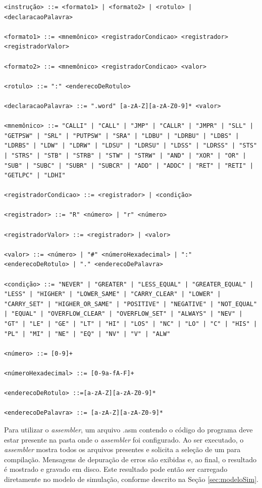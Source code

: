 \documentclass[
	12pt,				%
	openright,			%
	oneside,			%
	a4paper,			%
	english,			%
	french,				%
	spanish,			%
	brazil,				%
	]{abntex2}
\begin{document}
\begin{lstlisting}
<instrução> ::= <formato1> | <formato2> | <rotulo> | <declaracaoPalavra>

<formato1> ::= <mnemônico> <registradorCondicao> <registrador> <registradorValor>

<formato2> ::= <mnemônico> <registradorCondicao> <valor>

<rotulo> ::= ":" <enderecoDeRotulo>

<declaracaoPalavra> ::= ".word" [a-zA-Z][a-zA-Z0-9]* <valor>

<mnemônico> ::= "CALLI" | "CALL" | "JMP" | "CALLR" | "JMPR" | "SLL" | "GETPSW" | "SRL" | "PUTPSW" | "SRA" | "LDBU" | "LDRBU" | "LDBS" | "LDRBS" | "LDW" | "LDRW" | "LDSU" | "LDRSU" | "LDSS" | "LDRSS" | "STS" | "STRS" | "STB" | "STRB" | "STW" | "STRW" | "AND" | "XOR" | "OR" | "SUB" | "SUBC" | "SUBR" | "SUBCR" | "ADD" | "ADDC" | "RET" | "RETI" | "GETLPC" | "LDHI"

<registradorCondicao> ::= <registrador> | <condição>

<registrador> ::= "R" <número> | "r" <número>

<registradorValor> ::= <registrador> | <valor>

<valor> ::= <número> | "#" <númeroHexadecimal> | ":" <enderecoDeRotulo> | "." <enderecoDePalavra>

<condição> ::= "NEVER" | "GREATER" | "LESS_EQUAL" | "GREATER_EQUAL" | "LESS" | "HIGHER" | "LOWER_SAME" | "CARRY_CLEAR" | "LOWER" | "CARRY_SET" | "HIGHER_OR_SAME" | "POSITIVE" | "NEGATIVE" | "NOT_EQUAL" | "EQUAL" | "OVERFLOW_CLEAR" | "OVERFLOW_SET" | "ALWAYS" | "NEV" | "GT" | "LE" | "GE" | "LT" | "HI" | "LOS" | "NC" | "LO" | "C" | "HIS" | "PL" | "MI" | "NE" | "EQ" | "NV" | "V" | "ALW"

<número> ::= [0-9]+

<númeroHexadecimal> ::= [0-9a-fA-F]+

<enderecoDeRotulo> ::=[a-zA-Z][a-zA-Z0-9]*

<enderecoDePalavra> ::= [a-zA-Z][a-zA-Z0-9]*
\end{lstlisting}

Para utilizar o \textit{assembler}, um arquivo .asm contendo o código do programa deve estar presente na pasta onde o \textit{assembler} foi configurado. Ao ser executado, o \textit{assembler} mostra todos os arquivos presentes e solicita a seleção de um para compilação. Mensagens de depuração de erros são exibidas e, ao final, o resultado é mostrado e gravado em disco. Este resultado pode então ser carregado diretamente no modelo de simulação, conforme descrito na Seção \ref{sec:modeloSim}.
\end{document}
